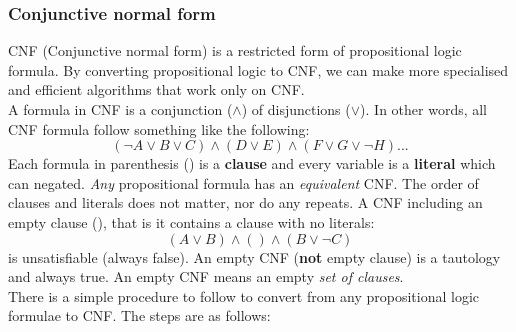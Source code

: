 \documentclass{article}
\newcommand{\n}[0]{\\[\baselineskip]}
\begin{document}
\subsubsection{Conjunctive normal form}
CNF (Conjunctive normal form) is a restricted form of propositional logic formula. By converting propositional logic to CNF, we can make more specialised and efficient algorithms that work only on CNF.
\n
A formula in CNF is a conjunction ($\wedge$) of disjunctions ($\vee$). In other words, all CNF formula follow something like the following:
\begin{equation}
(\neg A \vee B \vee C) \wedge (D \vee E) \wedge (F \vee G \vee \neg H) ...
\end{equation}
Each formula in parenthesis () is a \textbf{clause} and every variable is a \textbf{literal} which can negated. \textit{Any} propositional formula has an \textit{equivalent} CNF. The order of clauses and literals does not matter, nor do any repeats. A CNF including an empty clause (), that is it contains a clause with no literals:
\begin{equation}
(A \vee B) \wedge () \wedge (B \vee \neg C)
\end{equation}
is unsatisfiable (always false). An empty CNF (\textbf{not} empty clause) is a tautology and always true. An empty CNF means an empty \textit{set of clauses}.
\n
There is a simple procedure to follow to convert from any propositional logic formulae to CNF. The steps are as follows:
\end{document}
